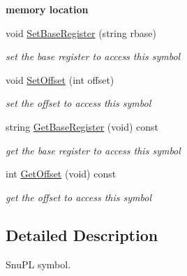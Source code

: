 \begin{Indent}{\bf memory location}\par
\begin{DoxyCompactItemize}
\item 
\hypertarget{classCSymbol_a85b9a60f3984e72266bc999600bcf45d}{void \hyperlink{classCSymbol_a85b9a60f3984e72266bc999600bcf45d}{Set\-Base\-Register} (string rbase)}\label{classCSymbol_a85b9a60f3984e72266bc999600bcf45d}

\begin{DoxyCompactList}\small\item\em set the base register to access this symbol \end{DoxyCompactList}\item 
\hypertarget{classCSymbol_a86fcbdd8873d9e53406f1e92fbf647ba}{void \hyperlink{classCSymbol_a86fcbdd8873d9e53406f1e92fbf647ba}{Set\-Offset} (int offset)}\label{classCSymbol_a86fcbdd8873d9e53406f1e92fbf647ba}

\begin{DoxyCompactList}\small\item\em set the offset to access this symbol \end{DoxyCompactList}\item 
\hypertarget{classCSymbol_a983716b2714ae2e45cb2a45ce32b29de}{string \hyperlink{classCSymbol_a983716b2714ae2e45cb2a45ce32b29de}{Get\-Base\-Register} (void) const }\label{classCSymbol_a983716b2714ae2e45cb2a45ce32b29de}

\begin{DoxyCompactList}\small\item\em get the base register to access this symbol \end{DoxyCompactList}\item 
\hypertarget{classCSymbol_a82a6711e642e10a720d14d0ac9860405}{int \hyperlink{classCSymbol_a82a6711e642e10a720d14d0ac9860405}{Get\-Offset} (void) const }\label{classCSymbol_a82a6711e642e10a720d14d0ac9860405}

\begin{DoxyCompactList}\small\item\em get the offset to access this symbol \end{DoxyCompactList}\end{DoxyCompactItemize}
\end{Indent}


\subsection{Detailed Description}
Snu\-P\-L symbol. 

